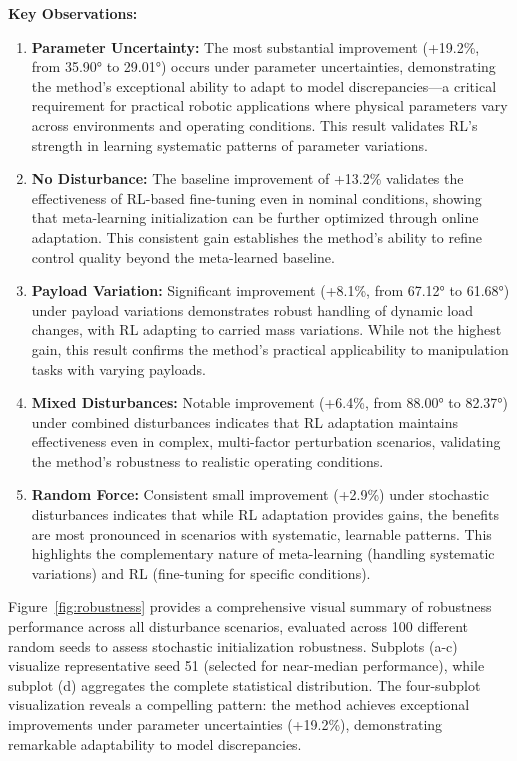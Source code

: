 \documentclass[DTMColor]{ROB-New}
\begin{document}
\textbf{Key Observations:}

\begin{enumerate}
    \item \textbf{Parameter Uncertainty:} The most substantial improvement (+19.2\%, from 35.90° to 29.01°) occurs under parameter uncertainties, demonstrating the method's exceptional ability to adapt to model discrepancies—a critical requirement for practical robotic applications where physical parameters vary across environments and operating conditions. This result validates RL's strength in learning systematic patterns of parameter variations.
    
    \item \textbf{No Disturbance:} The baseline improvement of +13.2\% validates the effectiveness of RL-based fine-tuning even in nominal conditions, showing that meta-learning initialization can be further optimized through online adaptation. This consistent gain establishes the method's ability to refine control quality beyond the meta-learned baseline.
    
    \item \textbf{Payload Variation:} Significant improvement (+8.1\%, from 67.12° to 61.68°) under payload variations demonstrates robust handling of dynamic load changes, with RL adapting to carried mass variations. While not the highest gain, this result confirms the method's practical applicability to manipulation tasks with varying payloads.
    
    \item \textbf{Mixed Disturbances:} Notable improvement (+6.4\%, from 88.00° to 82.37°) under combined disturbances indicates that RL adaptation maintains effectiveness even in complex, multi-factor perturbation scenarios, validating the method's robustness to realistic operating conditions.
    
    \item \textbf{Random Force:} Consistent small improvement (+2.9\%) under stochastic disturbances indicates that while RL adaptation provides gains, the benefits are most pronounced in scenarios with systematic, learnable patterns. This highlights the complementary nature of meta-learning (handling systematic variations) and RL (fine-tuning for specific conditions).
\end{enumerate}

Figure~\ref{fig:robustness} provides a comprehensive visual summary of robustness performance across all disturbance scenarios, evaluated across 100 different random seeds to assess stochastic initialization robustness. Subplots (a-c) visualize representative seed 51 (selected for near-median performance), while subplot (d) aggregates the complete statistical distribution. The four-subplot visualization reveals a compelling pattern: the method achieves exceptional improvements under parameter uncertainties (+19.2\%), demonstrating remarkable adaptability to model discrepancies. 
\end{document}
